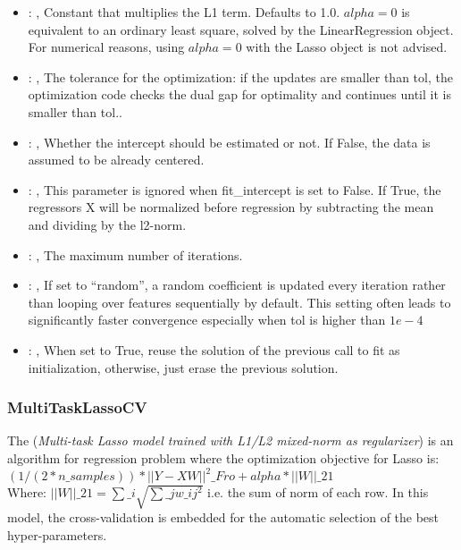 \begin{itemize}
    \item {}: , 
      Constant that multiplies the L1 term. Defaults to 1.0.
      $alpha = 0$ is equivalent to an ordinary least square, solved by
      the LinearRegression object. For numerical reasons, using $alpha = 0$
      with the Lasso object is not advised.

    \item {}: , 
      The tolerance for the optimization: if the updates are smaller
      than tol, the optimization code checks the dual gap for optimality and
      continues until it is smaller than tol..

    \item {}: , 
      Whether the intercept should be estimated or not. If False,
      the data is assumed to be already centered.

    \item {}: , 
      This parameter is ignored when fit\_intercept is set to False. If True,
      the regressors X will be normalized before regression by subtracting the mean and
      dividing by the l2-norm.

    \item {}: , 
      The maximum number of iterations.

    \item {}: , 
      If set to ``random'', a random coefficient is updated every iteration
      rather than looping over features sequentially by default. This setting
      often leads to significantly faster convergence especially when tol is higher than $1e-4$

    \item {}: , 
      When set to True, reuse the solution of the previous call
      to fit as initialization, otherwise, just erase the previous solution.
  \end{itemize}


\subsubsection{MultiTaskLassoCV}
  The  (\textit{Multi-task Lasso model trained
  with L1/L2 mixed-norm as regularizer}) is an algorithm for regression problem
  where the optimization objective for Lasso is:                         $(1 / (2 * n\_samples)) *
  ||Y - XW||^2\_{Fro} + alpha * ||W||\_{21}$                         \\Where:
  $||W||\_{21} = \sum\_i \sqrt{\sum\_j w\_{ij}^2}$                         i.e. the sum of norm of each
  row.                         In this model, the cross-validation is embedded for the automatic
  selection                         of the best hyper-parameters.


